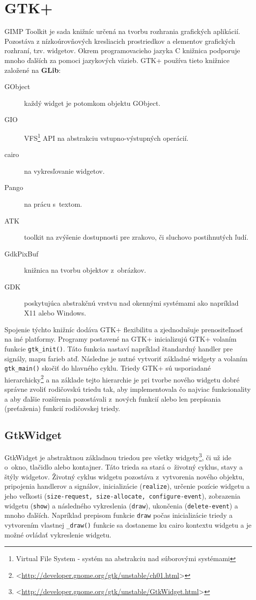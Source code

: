 \documentclass[12pt,oneside,final]{fithesis2}
\begin{document}
\section{GTK+}
GIMP Toolkit je sada knižníc určená na tvorbu rozhrania grafických aplikácií. Pozostáva z nízkoúrovňových kresliacich prostriedkov a elementov grafických rozhraní, tzv. widgetov. Okrem programovacieho jazyka C knižnica podporuje mnoho ďalších za pomoci jazykových väzieb. GTK+ používa tieto knižnice založené na \textbf{GLib}:
\begin{description}
\item[GObject] každý widget je potomkom objektu GObject.
\item[GIO] VFS\footnote{Virtual File System - systém na abstrakciu nad súborovými systémami} API na abstrakciu vstupno-výstupných operácií.
\item[cairo] na vykresľovanie widgetov.
\item[Pango] na prácu s~textom.
\item[ATK] toolkit na zvýšenie dostupnosti pre zrakovo, či sluchovo postihnutých ľudí.
\item[GdkPixBuf] knižnica na tvorbu objektov z~obrázkov.
\item[GDK] poskytujúca abstrakčnú vrstvu nad okennými systémami ako napríklad X11 alebo Windows.
\end{description}
Spojenie týchto knižníc dodáva GTK+ flexibilitu a zjednodušuje prenositeľnosť na iné platformy.
Programy postavené na GTK+ inicializujú GTK+ volaním funkcie \texttt{gtk\_\-init()}. Táto funkcia nastaví napríklad štandardný handler pre signály, mapu farieb atď. Následne je nutné vytvoriť základné widgety a volaním \texttt{gtk\_\-main()} skočiť do hlavného cyklu. Triedy GTK+ sú usporiadané hierarchicky\footnote{<\url{http://developer.gnome.org/gtk/unstable/ch01.html}>} a na základe tejto hierarchie je pri tvorbe nového widgetu dobré správne zvoliť rodičovskú triedu tak, aby implementovala čo najviac funkcionality a aby ďalšie rozšírenia pozostávali z~nových funkcií alebo len prepísania (preťaženia) funkcií rodičovskej triedy.
\subsection{GtkWidget}
GtkWidget je abstraktnou základnou triedou pre všetky widgety\footnote{<\url{http://developer.gnome.org/gtk/unstable/GtkWidget.html}>}, či už ide o~okno, tlačidlo alebo kontajner. Táto trieda sa stará o~životný cyklus, stavy a štýly widgetov. Životný cyklus widgetu pozostáva z~vytvorenia nového objektu, pripojenia handlerov a signálov, inicializácie (\texttt{realize}), určenie pozície widgetu a jeho veľkosti (\texttt{size-request, size-allocate, configure-event}), zobrazenia widgetu (\texttt{show}) a následného vykreslenia (\texttt{draw}), ukončenia (\texttt{delete-event}) a mnoho ďalších. Napríklad prepisom funkcie \texttt{draw} počas inicializácie triedy a vytvorením vlastnej \texttt{\_\-draw()} funkcie sa dostaneme ku cairo kontextu widgetu a je možné ovládať vykreslenie widgetu.
\end{document}
